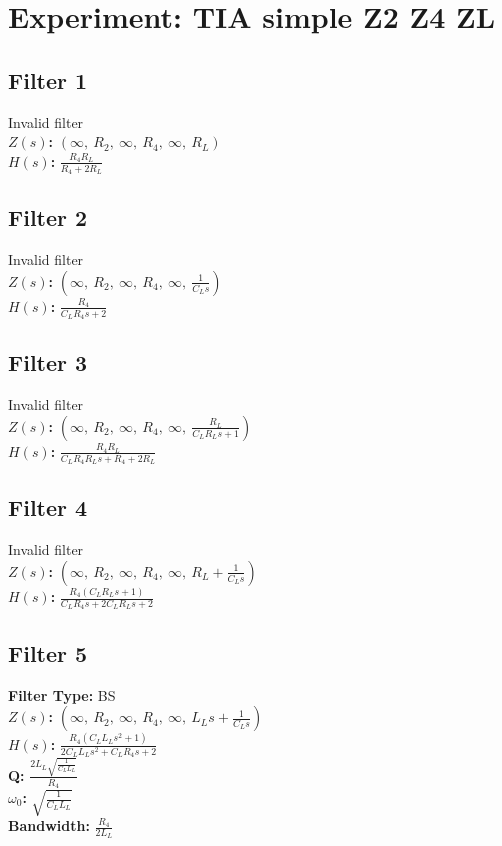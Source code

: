 \documentclass{article}
\begin{document}
        \section*{Experiment: TIA simple Z2 Z4 ZL}
\subsection*{Filter 1}
Invalid filter \\ 
\textbf{$Z(s)$:} $\left( \infty, \  R_{2}, \  \infty, \  R_{4}, \  \infty, \  R_{L}\right)$ \\ 
\textbf{$H(s)$:} $\frac{R_{4} R_{L}}{R_{4} + 2 R_{L}}$ \\ 
\subsection*{Filter 2}
Invalid filter \\ 
\textbf{$Z(s)$:} $\left( \infty, \  R_{2}, \  \infty, \  R_{4}, \  \infty, \  \frac{1}{C_{L} s}\right)$ \\ 
\textbf{$H(s)$:} $\frac{R_{4}}{C_{L} R_{4} s + 2}$ \\ 
\subsection*{Filter 3}
Invalid filter \\ 
\textbf{$Z(s)$:} $\left( \infty, \  R_{2}, \  \infty, \  R_{4}, \  \infty, \  \frac{R_{L}}{C_{L} R_{L} s + 1}\right)$ \\ 
\textbf{$H(s)$:} $\frac{R_{4} R_{L}}{C_{L} R_{4} R_{L} s + R_{4} + 2 R_{L}}$ \\ 
\subsection*{Filter 4}
Invalid filter \\ 
\textbf{$Z(s)$:} $\left( \infty, \  R_{2}, \  \infty, \  R_{4}, \  \infty, \  R_{L} + \frac{1}{C_{L} s}\right)$ \\ 
\textbf{$H(s)$:} $\frac{R_{4} \left(C_{L} R_{L} s + 1\right)}{C_{L} R_{4} s + 2 C_{L} R_{L} s + 2}$ \\ 
\subsection*{Filter 5}
\textbf{Filter Type:} BS \\ 
\textbf{$Z(s)$:} $\left( \infty, \  R_{2}, \  \infty, \  R_{4}, \  \infty, \  L_{L} s + \frac{1}{C_{L} s}\right)$ \\ 
\textbf{$H(s)$:} $\frac{R_{4} \left(C_{L} L_{L} s^{2} + 1\right)}{2 C_{L} L_{L} s^{2} + C_{L} R_{4} s + 2}$ \\ 
\textbf{Q:} $\frac{2 L_{L} \sqrt{\frac{1}{C_{L} L_{L}}}}{R_{4}}$ \\ 
\textbf{$\omega_0$:} $\sqrt{\frac{1}{C_{L} L_{L}}}$ \\ 
\textbf{Bandwidth:} $\frac{R_{4}}{2 L_{L}}$ \\ 
\end{document}
